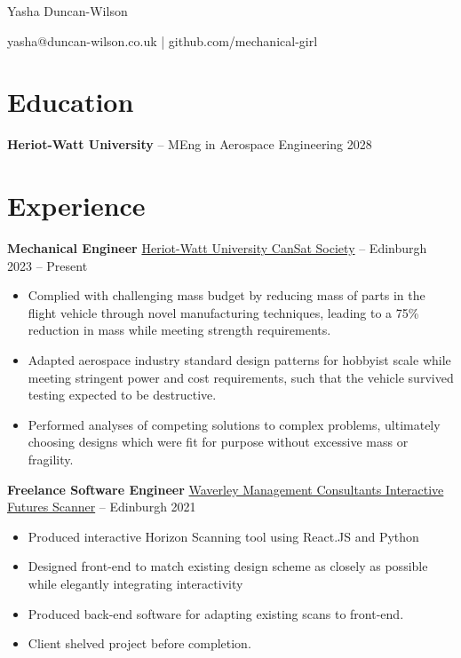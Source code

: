\documentclass[10pt,a4paper]{article}
\begin{document}
\centerline{\Huge Yasha Duncan-Wilson} 

\vspace{5pt}

\centerline{yasha@duncan-wilson.co.uk | github.com/mechanical-girl}

\vspace{-18.5pt}

\section*{Education}
\textbf{Heriot-Watt University} -- MEng in Aerospace Engineering \hfill 2028 \\

\vspace{-10pt}

\section*{Experience}
\textbf{Mechanical Engineer} \href{https://www.hwunion.com/societies/cansat/}{Heriot-Watt University CanSat Society} -- Edinburgh \hfill 2023 -- Present \\
\vspace{-9pt}
\begin{itemize}
  \item Complied with challenging mass budget by reducing mass of parts in the flight vehicle through novel manufacturing techniques, leading to a 75\% reduction in mass while meeting strength requirements.
  \item Adapted aerospace industry standard design patterns for hobbyist scale while meeting stringent power and cost requirements, such that the vehicle survived testing expected to be destructive.
  \item Performed analyses of competing solutions to complex problems, ultimately choosing designs which were fit for purpose without excessive mass or fragility.
\end{itemize}

\textbf{Freelance Software Engineer} \href{https://wmcscanner-87d09.web.app}{Waverley Management Consultants Interactive Futures Scanner} -- Edinburgh \hfill 2021 \\
\vspace{-9pt}
\begin{itemize}
  \item Produced interactive Horizon Scanning tool using React.JS and Python
  \item Designed front-end to match existing design scheme as closely as possible while elegantly integrating interactivity
  \item Produced back-end software for adapting existing scans to front-end.
  \item Client shelved project before completion.
\end{itemize}
\end{document}
